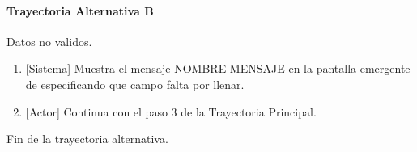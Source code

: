 \paragraph{Trayectoria Alternativa B} \label{A-PR-CU1.2:TB}
	Datos no validos.
	\begin{enumerate}[label=B\arabic*.]
		\item {[Sistema]} Muestra el mensaje NOMBRE-MENSAJE en la pantalla emergente de \textbf{} especificando que campo falta por llenar.
		\item {[Actor]} Continua con el paso 3 de la Trayectoria Principal.
	\end{enumerate}
	Fin de la trayectoria alternativa.